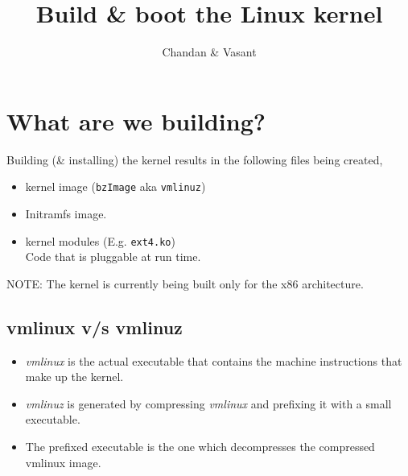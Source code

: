 \documentclass{beamer}
\title{Build \& boot the Linux kernel}
\author{Chandan \& Vasant}
\date{}
\begin{document}
\begin{frame}
  \titlepage
\end{frame}

\section{What are we building?}
\begin{frame}
\end{frame}

\begin{frame}
Building (\& installing) the kernel results in the following files being created,
\begin{itemize}
\item kernel image (\texttt{bzImage} aka \texttt{vmlinuz})
\item Initramfs image.
\item kernel modules (E.g. \texttt{ext4.ko}) \\
  Code that is pluggable at run time.
\end{itemize}
NOTE: The kernel is currently being built only for the x86 architecture.
\end{frame}

\subsection{vmlinux v/s vmlinuz}

\begin{frame}
  \begin{itemize}
  \item \emph{vmlinux} is the actual executable that contains the machine
    instructions that make up the kernel.
  \item \emph{vmlinuz} is generated by compressing \emph{vmlinux} and
    prefixing it with a small executable.
  \item The prefixed executable is the one which decompresses the compressed
    vmlinux image.
  \end{itemize}
\end{frame}
\end{document}
